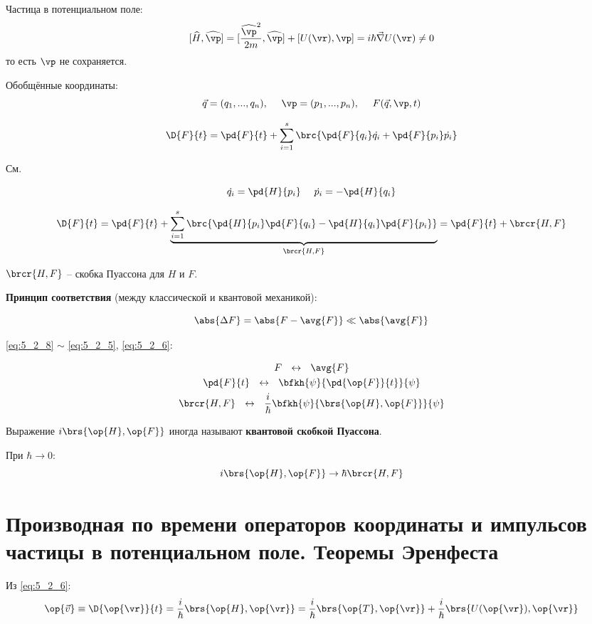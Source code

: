 Частица в потенциальном поле:
\begin{equation}
\label{eq:5_2_7}
[\widehat{H}, \widehat{\vp}] = [\frac{\widehat{\vp}^2}{2m}, \widehat{\vp}] + [U(\vr), \vp] = i \hbar \vec{\nabla} U(\vr) \ne 0
\end{equation}
то есть $\vp$ не сохраняется.

Обобщённые координаты:
$$
\vec{q} = (q_1, ..., q_n),~~~~ \vp = (p_1, ..., p_n), ~~~~ F(\vec{q}, \vp, t)
$$

$$
\D{F}{t} = \pd{F}{t} + \sum_{i=1}^{s}\brc{\pd{F}{q_i} \dot{q_i} + \pd{F}{p_i} \dot{p_i} }
$$

См.~

$$
\dot{q_i} = \pd{H}{p_i} ~~~~ \dot{p_i} = -\pd{H}{q_i}
$$

\begin{equation}
\label{eq:5_2_8}
\D{F}{t}= \pd{F}{t} + \underbrace{ \sum_{i=1}^{s} \brc{ \pd{H}{p_i} \pd{F}{q_i} - \pd{H}{q_i} \pd{F}{p_i} } }_{\brcr{H, F}} = \pd{F}{t} + \brcr{H, F}
\end{equation}

$\brcr{H, F}$ -- скобка Пуассона для $H$ и $F$.

\textbf{Принцип соответствия} (между классической и квантовой механикой):

$$
\abs{\Delta F} = \abs{F - \avg{F}} \ll \abs{\avg{F}}
$$

\eqref{eq:5_2_8} $\sim$ \eqref{eq:5_2_5}, \eqref{eq:5_2_6}:

$$
\begin{gathered}
F ~~\leftrightarrow~~ \avg{F} \\
\pd{F}{t} ~~\leftrightarrow~~ \bfkh{\psi}{\pd{\op{F}}{t}}{\psi} \\
\brcr{H, F} ~~\leftrightarrow~~ \frac{i}{\hbar} \bfkh{\psi}{ \brs{\op{H}, \op{F}} }{\psi}
\end{gathered}
$$

Выражение $i \brs{\op{H}, \op{F}}$ иногда называют \textbf{квантовой скобкой Пуассона}.

При $\hbar \to 0$:
$$
i \brs{\op{H}, \op{F}} \to \hbar \brcr{H, F}
$$


\section{Производная по времени операторов координаты и импульсов частицы в потенциальном поле. Теоремы Эренфеста}

Из \eqref{eq:5_2_6}:
$$
\op{\vec{v}} \equiv \D{\op{\vr}}{t} = \frac{i}{\hbar} \brs{\op{H}, \op{\vr}} = \frac{i}{\hbar} \brs{\op{T}, \op{\vr}} + \frac{i}{\hbar} \brs{U(\op{\vr}), \op{\vr}}
$$

